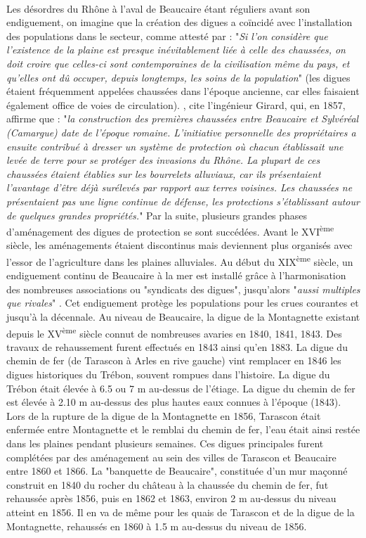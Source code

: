 		\paragraph{} Les désordres du Rhône à l'aval de Beaucaire étant réguliers avant son endiguement, on imagine que la création des digues a coïncidé avec l'installation des populations dans le secteur, comme attesté par \citet{surell_memoire_1847} : "\textit{Si l'on considère que l'existence de la plaine est presque inévitablement liée à celle des chaussées, on doit croire que celles-ci sont contemporaines de la civilisation même du pays, et qu'elles ont dû occuper, depuis longtemps, les soins de la population}" (les digues étaient fréquemment appelées chaussées dans l'époque ancienne, car elles faisaient également office de voies de circulation). \citet{mejean_etude_2017}, cite l'ingénieur Girard, qui, en 1857, affirme que : "\textit{la construction des premières chaussées entre Beaucaire et Sylvéréal (Camargue) date de l'époque romaine. L'initiative personnelle des propriétaires a ensuite contribué à dresser un système de protection où chacun établissait une levée de terre pour se protéger des invasions du Rhône. La plupart de ces chaussées étaient établies sur les bourrelets alluviaux, car ils présentaient l'avantage d'être déjà surélevés par rapport aux terres voisines. Les chaussées ne présentaient pas une ligne continue de défense, les protections s'établissant autour de quelques grandes propriétés.}" Par la suite, plusieurs grandes phases d'aménagement des digues de protection se sont succédées. Avant le XVI\textsuperscript{ème} siècle, les aménagements étaient discontinus mais deviennent plus organisés avec l'essor de l'agriculture dans les plaines alluviales. Au début du XIX\textsuperscript{ème} siècle, un endiguement continu de Beaucaire à la mer est installé grâce à l'harmonisation des nombreuses associations ou "syndicats des digues", jusqu'alors "\textit{aussi multiples que rivales}" \citep{pichard_sept_2014}. Cet endiguement protège les populations pour les crues courantes et jusqu'à la décennale. Au niveau de Beaucaire, la digue de la Montagnette existant depuis le XV\textsuperscript{ème} siècle connut de nombreuses avaries en 1840, 1841, 1843. Des travaux de rehaussement furent effectués en 1843 ainsi qu'en 1883. La digue du chemin de fer (de Tarascon à Arles en rive gauche) vint remplacer en 1846 les digues historiques du Trébon, souvent rompues dans l'histoire. La digue du Trébon était élevée à 6.5 ou 7 m au-dessus de l'étiage. La digue du chemin de fer est élevée à 2.10 m au-dessus des plus hautes eaux connues à l'époque (1843). Lors de la rupture de la digue de la Montagnette en 1856, Tarascon était enfermée entre Montagnette et le remblai du chemin de fer, l'eau était ainsi restée dans les plaines pendant plusieurs semaines. Ces digues principales furent complétées par des aménagement au sein des villes de Tarascon et Beaucaire entre 1860 et 1866. La "banquette de Beaucaire", constituée d'un mur maçonné construit en 1840 du rocher du château à la chaussée du chemin de fer, fut rehaussée après 1856, puis en 1862 et 1863, environ 2 m au-dessus du niveau atteint en 1856. Il en va de même pour les quais de Tarascon et de la digue de la Montagnette, rehaussés en 1860 à 1.5 m au-dessus du niveau de 1856.
		
